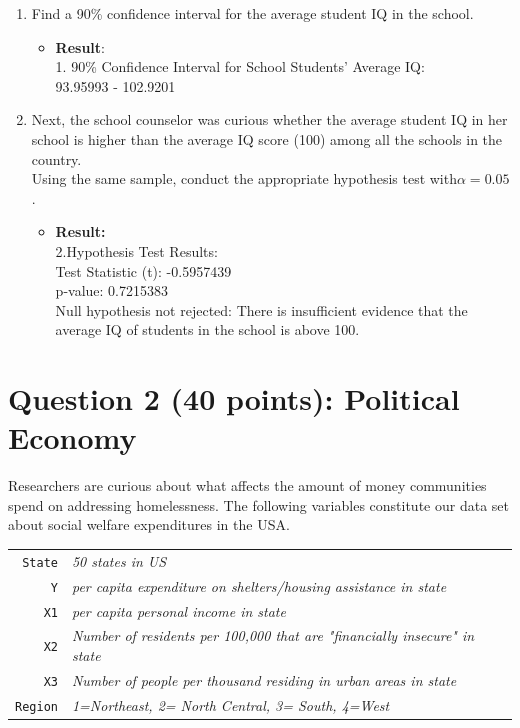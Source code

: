 \documentclass[12pt,letterpaper]{article}
\begin{document}
\begin{enumerate}
	\item Find a 90\% confidence interval for the average student IQ in the school.\\
	  
	  \begin{itemize}
		\item \textbf{Result}:\\
		 1. 90\% Confidence Interval for School Students' Average IQ:\\
		 93.95993 - 102.9201\\
		
       \end{itemize}
	\item Next, the school counselor was curious  whether  the average student IQ in her school is higher than the average IQ score (100) among all the schools in the country.\\ 
	\noindent Using the same sample, conduct the appropriate hypothesis test with$\alpha=0.05$.
		 
		\begin{itemize}
	      \item \textbf{Result:}\\
		  2.Hypothesis Test Results:\\
		  Test Statistic (t): -0.5957439\\ 
		  p-value: 0.7215383 \\
		  Null hypothesis not rejected: There is insufficient evidence that the average IQ of students in the school is above 100.
	\end{itemize}
\end{enumerate}

\newpage

	\section*{Question 2 (40 points): Political Economy}

\noindent Researchers are curious about what affects the amount of money communities spend on addressing homelessness. The following variables constitute our data set about social welfare expenditures in the USA. \\
\vspace{.5cm}


\begin{tabular}{r|l}
	\texttt{State} &\emph{50 states in US} \\
	\texttt{Y} & \emph{per capita expenditure on shelters/housing assistance in state}\\
	\texttt{X1} &\emph{per capita personal income in state} \\
	\texttt{X2} &  \emph{Number of residents per 100,000 that are "financially insecure" in state}\\
	\texttt{X3} &  \emph{Number of people per thousand residing in urban areas in state} \\
	\texttt{Region} &  \emph{1=Northeast, 2= North Central, 3= South, 4=West} \\
\end{tabular}
\end{document}
